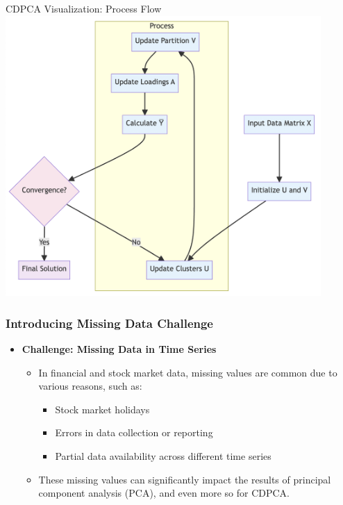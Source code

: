 \documentclass{beamer}
\begin{document}
\begin{frame}{CDPCA Visualization: Process Flow}
    \centering
    \includegraphics[width=0.9\textwidth,height=0.7\textheight,keepaspectratio]{cdpca-chart.png}
\end{frame}


\begin{frame}
    \frametitle{Introducing Missing Data Challenge}

    \begin{itemize}
        \item \textbf{Challenge: Missing Data in Time Series}
        \begin{itemize}
            \item In financial and stock market data, missing values are common due to various reasons, such as:
            \begin{itemize}
                \item Stock market holidays
                \item Errors in data collection or reporting
                \item Partial data availability across different time series
            \end{itemize}
            \item These missing values can significantly impact the results of principal component analysis (PCA), and even more so for CDPCA.
        \end{itemize}

    \end{itemize}
\end{frame}
\end{document}
